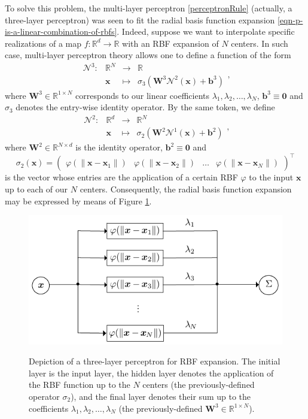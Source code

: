 \documentclass[12pt]{report} %
\newcommand{\tmmathbf}[1]{\ensuremath{\boldsymbol{#1}}}
\begin{document}
To solve this problem, the multi-layer perceptron \eqref{perceptronRule}
(actually, a three-layer perceptron) was seen to fit the radial basis function
expansion \eqref{eqn-p-is-a-linear-combination-of-rbfs}. Indeed, suppose we want
to interpolate specific realizations of a map $f : \mathbb{R}^d \rightarrow
  \mathbb{R}$ with an RBF expansion of $N$ centers. In such case, multi-layer
perceptron theory allows one to define a function of the form
\[ \begin{array}{cccc}
    \mathcal{N}^3 : & \mathbb{R}^N & \rightarrow & \mathbb{R}                             \\
                    & \tmmathbf{x} & \mapsto     & \sigma_3 (\tmmathbf{W}^3 \mathcal{N}^2
    (\tmmathbf{x}) +\tmmathbf{b}^3)
  \end{array}, \]
where $\tmmathbf{W}^3 \in \mathbb{R}^{1 \times N}$ corresponds to our linear
coefficients $\lambda_1, \lambda_2, \ldots, \lambda_N$, $\tmmathbf{b}^3 \equiv
  \tmmathbf{0}$ and $\sigma_3$ denotes the entry-wise identity operator. By the
same token, we define
\[ \begin{array}{cccc}
    \mathcal{N}^2 : & \mathbb{R}^d & \rightarrow & \mathbb{R}^N                           \\
                    & \tmmathbf{x} & \mapsto     & \sigma_2 (\tmmathbf{W}^2 \mathcal{N}^1
    (\tmmathbf{x}) +\tmmathbf{b}^2)
  \end{array}, \]
where $\tmmathbf{W}^2 \in \mathbb{R}^{N \times d}$ is the identity operator,
$\tmmathbf{b}^2 \equiv \tmmathbf{0}$ and
\[ \sigma_2 (\tmmathbf{x}) = \left(\begin{array}{cccc}
    \varphi (\| \tmmathbf{x}-\tmmathbf{x}_1 \|) & \varphi (\|
    \tmmathbf{x}-\tmmathbf{x}_2 \|)             & \ldots      & \varphi (\|
    \tmmathbf{x}-\tmmathbf{x}_N \|)
  \end{array}\right)^{\top} \]
is the vector whose entries are the application of a certain RBF $\varphi$ to the input
$\tmmathbf{x}$ up to each of our $N$ centers. Consequently, the radial basis
function expansion may be expressed by means of Figure \ref{fig-rbf-drawing}.
\begin{figure}[ht]
  {\includegraphics[width=.7\textwidth]{imagenes/rbf_discussion/rbf-nn-graph.pdf}}
  \caption{Depiction of a three-layer perceptron for RBF expansion. The
    initial layer is the input layer, the hidden layer denotes the application
    of the RBF function up to the $N$ centers (the previously-defined operator
    $\sigma_2$), and the final layer denotes their sum up to the coefficients
    $\lambda_1, \lambda_2, \ldots, \lambda_N$ (the previously-defined
    $\tmmathbf{W}^3 \in \mathbb{R}^{1 \times N}$).
    \label{fig-rbf-drawing}}
\end{figure}
\end{document}
